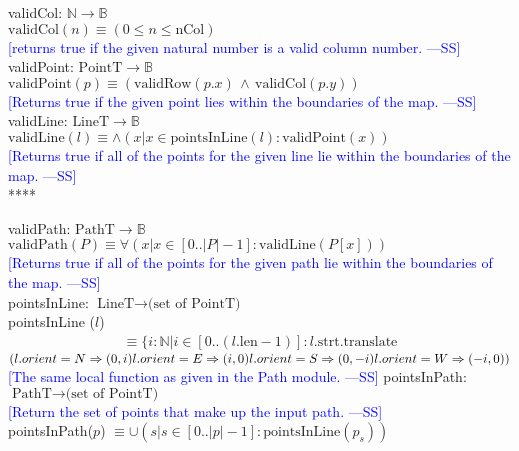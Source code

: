 \documentclass[12pt]{article}
\newcommand{\authornote}[3]{\textcolor{#1}{[#3 ---#2]}}
\newcommand{\authornote}[3]{}
\newcommand{\wss}[1]{\authornote{blue}{SS}{#1}}
\begin{document}
\noindent validCol: $\mathbb{N} \rightarrow \mathbb{B}$\\
\noindent $\mbox{validCol}(n) \equiv (0 \leq n \leq \mbox{nCol})$ \\ \wss{returns true if the given natural number is a valid column
  number.}\\

\noindent validPoint: $\mbox{PointT} \rightarrow \mathbb{B}$\\
\noindent $\mbox{validPoint}(p) \equiv (\mbox{validRow}(p.x)\, \land \,\mbox{validCol}(p.y))$\\ \wss{Returns true if the given point lies within the boundaries of the
  map.}\\

\noindent validLine: $\mbox{LineT} \rightarrow \mathbb{B}$\\
\noindent $\mbox{validLine}(l) \equiv \land(x | x \in \mbox{pointsInLine}(l) : \mbox{validPoint}(x))$ \\ \wss{Returns true if all of the points for the given line lie within the boundaries of the 
  map.}\\ ****

\noindent validPath: $\mbox{PathT} \rightarrow \mathbb{B}$\\
\noindent $\mbox{validPath}(P) \equiv \forall(x | x \in [0 .. |P| - 1] : \mbox{validLine}(P[x]))$ \\ \wss{Returns true if all of the points for the given path lie within the boundaries of the
  map.}\\

\noindent pointsInLine: $\mbox{LineT} \rightarrow \mbox{(set of PointT)}$\\
\noindent pointsInLine ($l$) 
\begin{multline*}
\equiv \{ i: \mathbb{N} | i \in [0
  .. (l.\mbox{len} - 1)] : l.\mbox{strt}.\mbox{translate}
\end{multline*} $(l.orient = N \Rightarrow (0,i)\\
				l.orient = E \Rightarrow (i,0)\\
				l.orient = S \Rightarrow (0,- i)\\
				l.orient = W \Rightarrow (-i,0)) $
\wss{The same local function as given in the Path module.}
\noindent pointsInPath: $\mbox{PathT} \rightarrow \mbox{(set of PointT)}$\\
\wss{Return the set of points that make up the input path.} \\
\noindent pointsInPath($p$) $\equiv \cup(s | s \in [0 .. |p| - 1]: \mbox{pointsInLine}(p_s))$
\newpage
\end{document}
